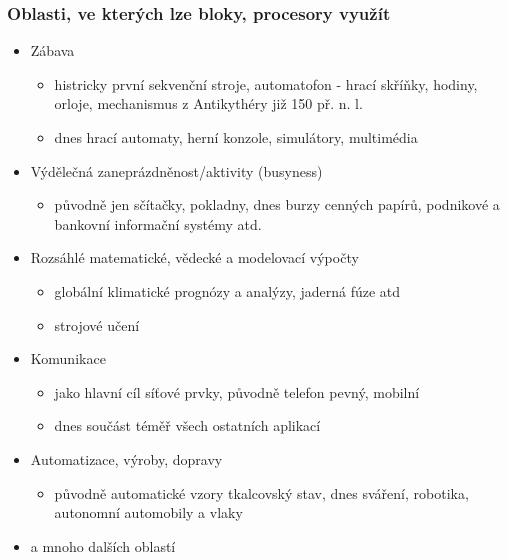 \documentclass{beamer}
\begin{document}
\begin{frame}
\frametitle{Oblasti, ve kterých lze bloky, procesory využít}

\begin{itemize}
 \item Zábava
 \begin{itemize}
  \item histricky první sekvenční stroje, automatofon - hrací skříňky, hodiny, orloje, mechanismus z Antikythéry již 150 př. n. l.
  \item dnes hrací automaty, herní konzole, simulátory, multimédia
 \end{itemize}
 \item Výdělečná zaneprázdněnost/aktivity (busyness)
 \begin{itemize}
  \item původně jen sčítačky, pokladny, dnes burzy cenných papírů, podnikové a bankovní informační systémy atd.
 \end{itemize}
 \item Rozsáhlé matematické, vědecké a modelovací výpočty
 \begin{itemize}
  \item globální klimatické prognózy a analýzy, jaderná fúze atd
  \item strojové učení
 \end{itemize}
 \item Komunikace
 \begin{itemize}
  \item jako hlavní cíl síťové prvky, původně telefon pevný, mobilní
  \item dnes součást téměř všech ostatních aplikací
 \end{itemize}
 \item Automatizace, výroby, dopravy
 \begin{itemize}
  \item původně automatické vzory tkalcovský stav, dnes sváření, robotika, autonomní automobily a vlaky
 \end{itemize}
 \item a mnoho dalších oblastí
\end{itemize}
\end{frame}
\end{document}
